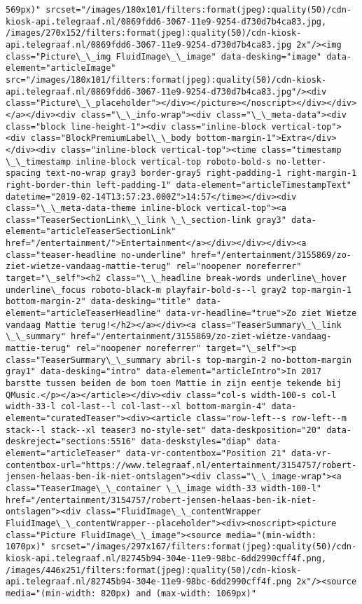\documentclass[11pt]{article}
\begin{document}
\begin{Verbatim}[commandchars=\\\{\}]
569px)" srcset="/images/180x101/filters:format(jpeg):quality(50)/cdn-kiosk-api.telegraaf.nl/0869fdd6-3067-11e9-9254-d730d7b4ca83.jpg, /images/270x152/filters:format(jpeg):quality(50)/cdn-kiosk-api.telegraaf.nl/0869fdd6-3067-11e9-9254-d730d7b4ca83.jpg 2x"/><img class="Picture\_\_img FluidImage\_\_image" data-desking="image" data-element="articleImage" src="/images/180x101/filters:format(jpeg):quality(50)/cdn-kiosk-api.telegraaf.nl/0869fdd6-3067-11e9-9254-d730d7b4ca83.jpg"/><div class="Picture\_\_placeholder"></div></picture></noscript></div></div></a></div><div class="\_\_info-wrap"><div class="\_\_meta-data"><div class="block line-height-1"><div class="inline-block vertical-top"><div class="BlockPremiumLabel\_\_body bottom-margin-1">Extra</div></div><div class="inline-block vertical-top"><time class="timestamp \_\_timestamp inline-block vertical-top roboto-bold-s no-letter-spacing text-no-wrap gray3 border-gray5 right-padding-1 right-margin-1 right-border-thin left-padding-1" data-element="articleTimestampText" datetime="2019-02-14T13:57:23.000Z">14:57</time></div><div class="\_\_meta-data-theme inline-block vertical-top"><a class="TeaserSectionLink\_\_link \_\_section-link gray3" data-element="articleTeaserSectionLink" href="/entertainment/">Entertainment</a></div></div></div><a class="teaser-headline no-underline" href="/entertainment/3155869/zo-ziet-wietze-vandaag-mattie-terug" rel="noopener noreferrer" target="\_self"><h2 class="\_\_headline break-words underline\_hover underline\_focus roboto-black-m playfair-bold-s--l gray2 top-margin-1 bottom-margin-2" data-desking="title" data-element="articleTeaserHeadline" data-vr-headline="true">Zo ziet Wietze vandaag Mattie terug!</h2></a></div><a class="TeaserSummary\_\_link \_\_summary" href="/entertainment/3155869/zo-ziet-wietze-vandaag-mattie-terug" rel="noopener noreferrer" target="\_self"><p class="TeaserSummary\_\_summary abril-s top-margin-2 no-bottom-margin gray1" data-desking="intro" data-element="articleIntro">In 2017 barstte tussen beiden de bom toen Mattie in zijn eentje tekende bij QMusic.</p></a></article></div><div class="col-s width-100-s col-l width-33-l col-last--l col-last--xl bottom-margin-4" data-element="curatedTeaser"><div><article class="row-left--s row-left--m stack--l stack--xl teaser3 no-style-set" data-deskposition="20" data-deskreject="sections:5516" data-deskstyles="diap" data-element="articleTeaser" data-vr-contentbox="Position 21" data-vr-contentbox-url="https://www.telegraaf.nl/entertainment/3154757/robert-jensen-helaas-ben-ik-niet-ontslagen"><div class="\_\_image-wrap"><a class="TeaserImage\_\_container \_\_image width-33 width-100-l" href="/entertainment/3154757/robert-jensen-helaas-ben-ik-niet-ontslagen"><div class="FluidImage\_\_contentWrapper FluidImage\_\_contentWrapper--placeholder"><div><noscript><picture class="Picture FluidImage\_\_image"><source media="(min-width: 1070px)" srcset="/images/297x167/filters:format(jpeg):quality(50)/cdn-kiosk-api.telegraaf.nl/82745b94-304e-11e9-98bc-6dd2990cff4f.png, /images/446x251/filters:format(jpeg):quality(50)/cdn-kiosk-api.telegraaf.nl/82745b94-304e-11e9-98bc-6dd2990cff4f.png 2x"/><source media="(min-width: 820px) and (max-width: 1069px)" 
\end{Verbatim}
\end{document}
